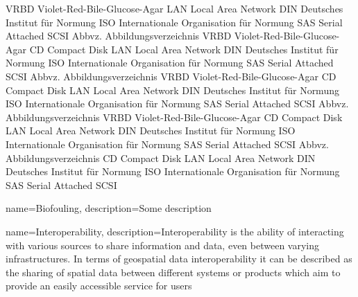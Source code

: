   {VRBD}   {Violet-Red-Bile-Glucose-Agar}
   {LAN}    {Local Area Network}
   {DIN}    {Deutsches Institut für Normung}
   {ISO}    {Internationale Organisation für Normung}
   {SAS}    {Serial Attached SCSI}
 {Abbvz.} {Abbildungsverzeichnis}
    {VRBD}   {Violet-Red-Bile-Glucose-Agar}
    {CD}     {Compact Disk}
    {LAN}    {Local Area Network}
    {DIN}    {Deutsches Institut für Normung}
    {ISO}    {Internationale Organisation für Normung}
    {SAS}    {Serial Attached SCSI}
    {Abbvz.} {Abbildungsverzeichnis}
    {VRBD}   {Violet-Red-Bile-Glucose-Agar}
    {CD}     {Compact Disk}
    {LAN}    {Local Area Network}
    {DIN}    {Deutsches Institut für Normung}
    {ISO}    {Internationale Organisation für Normung}
    {SAS}    {Serial Attached SCSI}
    {Abbvz.} {Abbildungsverzeichnis}
    {VRBD}   {Violet-Red-Bile-Glucose-Agar}
    {CD}     {Compact Disk}
    {LAN}    {Local Area Network}
    {DIN}    {Deutsches Institut für Normung}
    {ISO}    {Internationale Organisation für Normung}
    {SAS}    {Serial Attached SCSI}
    {Abbvz.} {Abbildungsverzeichnis}
    {CD}     {Compact Disk}
    {LAN}    {Local Area Network}
    {DIN}    {Deutsches Institut für Normung}
    {ISO}    {Internationale Organisation für Normung}
    {SAS}    {Serial Attached SCSI}


     {
        name=Biofouling,
        description={Some description}}

     {
        name=Interoperability,
        description={Interoperability is the ability of interacting with various sources to share information and data, even between varying infrastructures. In terms of geospatial data interoperability it can be described as the sharing of spatial data between different systems or products which aim to provide an easily accessible service for users}}
    
